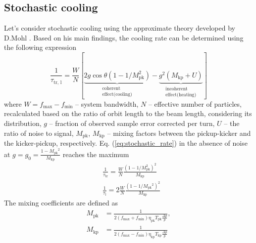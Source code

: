 \documentclass[submitting]{nst}
\begin{document}
\subsection{Stochastic cooling}
\par Let's consider stochastic cooling using the approximate theory developed by D.Mohl \cite{b5, b6}. Based on his main findings, the cooling rate can be determined using the following expression
\begin{equation}
\frac{1}{\tau_{\textrm{tr, l}}}=\frac{W}{N}[\underbrace{2 g \cos \theta\left(1-1 / M_{\textrm{pk}}^2\right)}_{\begin{array}{c}
\text { coherent } \\
\text { effect(cooling) }
\end{array}}-\underbrace{g^2\left(M_{\textrm{kp}}+U\right)}_{\begin{array}{c}
\text { incoherent } \\
\text { effect(heating) }
\end{array}}]
\label{eq:stochastic_rate}
\end{equation}	
\noindent where $W=f_{\text{max}}-f_{\text{min}}$ -- system bandwidth, $N$ -- effective number of particles, recalculated based on the ratio of orbit length to the beam length, considering its distribution, $g$ -- fraction of observed sample error corrected per turn, $U$ -- the ratio of noise to signal, $M_{\text{pk}}$, $M_{\text{kp}}$ -- mixing factors between the pickup-kicker and the kicker-pickup, respectively. Eq. (\ref{eq:stochastic_rate}) in the absence of noise at $g=g_0={\frac{1-{M_{\text{pk}}}^2}{M_{\text{kp}}}}$ reaches the maximum
\begin{equation}
\begin{aligned}
& \frac{1}{\tau_{\textrm{tr}}}=\frac{W}{N} \frac{\left(1-1 / M_{\textrm{pk}}^2\right)^2}{M_{\textrm{kp}}} \\
& \frac{1}{\tau_{\textrm{l}}}=2 \frac{W}{N} \frac{\left(1-1 / M_{\textrm{pk}}{ }^2\right)^2}{M_{\textrm{kp}}}
\end{aligned} 
\label{eq:cooling_rate}
\end{equation}
\noindent The mixing coefficients are defined as
\begin{equation}
\begin{aligned}
M_{\textrm{pk}} & =\frac{1}{2\left(f_{\max }+f_{\min }\right) \eta_{\textrm{pk}} T_{\textrm{pk}} \frac{\Delta p}{p}}, \\
M_{\textrm{kp}} & =\frac{1}{2\left(f_{\max }-f_{\min }\right) \eta_{\textrm{kp}} T_{\textrm{kp}} \frac{\Delta p}{p}}
\end{aligned}
\label{eq:mixing_coeff}
\end{equation}
\end{document}
